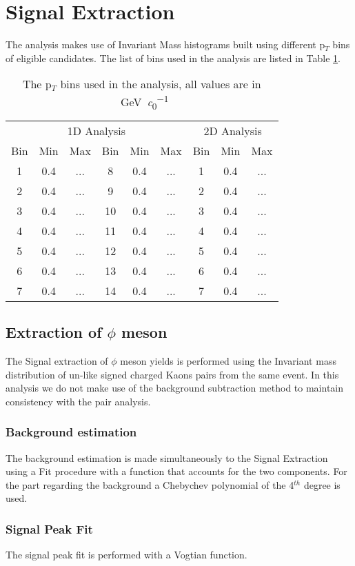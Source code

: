 \section{Signal Extraction}
\label{sec:SignalExtraction}
The analysis makes use of Invariant Mass histograms built using different p$_T$ bins of eligible candidates. The list of bins used in the analysis are listed in Table \ref{tab:PTbins}.

\begin{table}
\center
\begin{tabular}{ccc|ccc||ccc}
\multicolumn{6}{c}{1D Analysis} 					&\multicolumn{3}{c}{2D Analysis}\\
Bin	&Min		&Max	&Bin		&Min		&Max	&Bin		&Min		&Max\\
\hline
1	&0.4		&...		&8		&0.4		&...		&1		&0.4		&...\\
2	&0.4		&...		&9		&0.4		&...		&2		&0.4		&...\\
3	&0.4		&...		&10		&0.4		&...		&3		&0.4		&...\\
4	&0.4		&...		&11		&0.4		&...		&4		&0.4		&...\\
5	&0.4		&...		&12		&0.4		&...		&5		&0.4		&...\\
6	&0.4		&...		&13		&0.4		&...		&6		&0.4		&...\\
7	&0.4		&...		&14		&0.4		&...		&7		&0.4		&...\\
\end{tabular}
\label{tab:PTbins}
\caption{The p$_{T}$ bins used in the analysis, all values are in \SI{}{\giga \electronvolt \per \clight}}
\end{table}

\subsection{Extraction of $\phi$ meson}
The Signal extraction of $\phi$ meson yields is performed using the Invariant mass distribution of un-like signed charged Kaons pairs from the same event. In this analysis we do not make use of the background subtraction method to maintain consistency with the pair analysis.
\subsubsection{Background estimation}
The background estimation is made simultaneously to the Signal Extraction using a Fit procedure with a function that accounts for the two components. For the part regarding the background a Chebychev polynomial of the 4$^{th}$ degree is used. 
\subsubsection{Signal Peak Fit}
The signal peak fit is performed with a Vogtian function.

